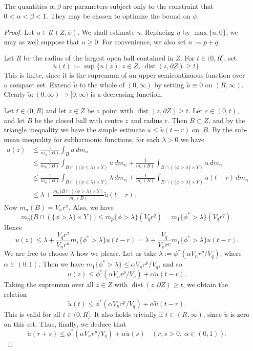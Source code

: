 \documentclass[10pt,a4paper]{amsart}
\DeclareMathOperator{\dist}{dist}
\newcommand{\cU}{\mathcal{U}}
\renewcommand{\tilde}{\widetilde}
\begin{document}
\begin{remark}
The quantities $\alpha,\beta$ are parameters subject only to the constraint that $0<\alpha<\beta<1$.
They may be chosen to optimize the bound on $\psi$.
\end{remark}

\begin{proof}
Let $u\in\cU(Z,\phi)$. We shall estimate $u$.
Replacing $u$ by $\max\{u,0\}$,
we may as well suppose  that $u\ge0$.
For convenience, we also set $n:=p+q$.

Let $R$ be the radius of the largest open ball contained
in $Z$. 
For $t\in(0,R]$, set
\[
\tilde{u}(t):=\sup\{u(z):z\in Z,~\dist(z,\partial Z)\ge t\}.
\]
This is finite, since it is the supremum of an upper
semicontinuous function over a compact set.
Extend $\tilde{u}$ to the whole of $(0,\infty)$
by setting $\tilde{u}\equiv 0$ on $(R,\infty)$.
Clearly $\tilde{u}:(0,\infty)\to[0,\infty)$ is a decreasing function.

Let $t\in(0,R]$ and let $z\in Z$ be a point with
$\dist(z,\partial Z)\ge t$. Let $r\in(0,t)$, and let $B$
be the closed ball with centre $z$ and radius $r$.
Then $B\subset Z$, and by the triangle inequality
we have the simple estimate $u\le \tilde{u}(t-r)$ on~$B$.
By the sub-mean
inequality for subharmonic functions, for each $\lambda>0$ we have
\begin{align*}
u(z)
&\le \frac{1}{m_n(B)}\int_B u\,dm_n\\
&\le \frac{1}{m_n(B)}\int_{B\cap(\{\phi\le \lambda\}\times Y)}u\,dm_n
+ \frac{1}{m_n(B)}\int_{B\cap(\{\phi> \lambda\}\times Y)}u\,dm_n\\
&\le \frac{1}{m_n(B)}\int_{B\cap (\{\phi\le \lambda\}\times Y)}\lambda \,dm_n
+ \frac{1}{m_n(B)}\int_{B\cap (\{\phi> \lambda\}\times Y)}\tilde{u}(t-r)\,dm_n\\
&\le \lambda +\frac{m_n(B\cap (\{\phi>\lambda\}\times Y)}{m_n(B)}\tilde{u}(t-r).
\end{align*}
Now $m_n(B)=V_nr^n$. Also, we have
\[
m_n\bigl(B\cap (\{\phi>\lambda\}\times Y)\bigr)
\le m_p\{\phi>\lambda\}(V_qr^q)
=m_1\{\phi^*>\lambda\}(V_qr^q).
\]
Hence
\[
u(z)\le \lambda+\frac{V_q r^q}{V_nr^n}m_1\{\phi^*>\lambda\}\tilde{u}(t-r)
= \lambda+\frac{V_q}{V_nr^p}m_1\{\phi^*>\lambda\}\tilde{u}(t-r).
\]
We are free to choose $\lambda$ how we please.
Let us take $\lambda:=\phi^*(\alpha V_nr^p/V_q)$, where $\alpha\in(0,1)$.
Then we have
$m_1\{\phi^*>\lambda\}\le \alpha V_nr^p/V_q$, and so
\[
u(z)\le \phi^*(\alpha V_nr^p/V_q)+\alpha \tilde{u}(t-r).
\]
Taking the supremum over all $z\in Z$ with
$\dist(z,\partial Z)\ge t$, we obtain the relation
\[
\tilde{u}(t)\le \phi^*(\alpha V_nr^p/V_q)+\alpha \tilde{u}(t-r).
\]
This is valid for all $t\in(0,R]$. 
It also holds trivially if $t\in(R,\infty)$,
since $\tilde{u}$ is zero on this set.
Thus, finally, we deduce that
\begin{equation}\label{E:relation}
\tilde{u}(r+s)\le \phi^*(\alpha V_nr^p/V_q)+\alpha \tilde{u}(s)
\quad(r,s>0,~\alpha\in(0,1)).
\end{equation}



\end{proof}
\end{document}
